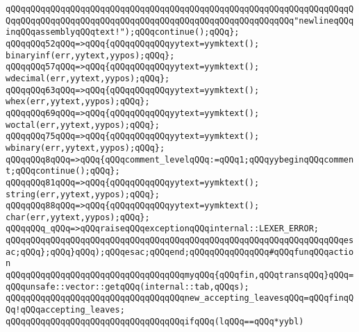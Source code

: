 \verb|qQQqqQQqqQQqqQQqqQQqqQQqqQQqqQQqqQQqqQQqqQQqqQQqqQQqqQQqqQQqqQQqqQQqqQQqqQQqqQQqqQQqqQQqqQQqqQQqqQQqqQQqqQQqqQQqqQQqqQQqqQQqqQQq"newlineqQQqinqQQqassemblyqQQqtext!");qQQqcontinue();qQQq};|\newline
\verb|qQQqqQQq52qQQq=>qQQq{qQQqqQQqqQQqyytext=yymktext();|\newline
\verb|binaryinf(err,yytext,yypos);qQQq};|\newline
\verb|qQQqqQQq57qQQq=>qQQq{qQQqqQQqqQQqyytext=yymktext();|\newline
\verb|wdecimal(err,yytext,yypos);qQQq};|\newline
\verb|qQQqqQQq63qQQq=>qQQq{qQQqqQQqqQQqyytext=yymktext();|\newline
\verb|whex(err,yytext,yypos);qQQq};|\newline
\verb|qQQqqQQq69qQQq=>qQQq{qQQqqQQqqQQqyytext=yymktext();|\newline
\verb|woctal(err,yytext,yypos);qQQq};|\newline
\verb|qQQqqQQq75qQQq=>qQQq{qQQqqQQqqQQqyytext=yymktext();|\newline
\verb|wbinary(err,yytext,yypos);qQQq};|\newline
\verb|qQQqqQQq8qQQq=>qQQq{qQQqcomment_levelqQQq:=qQQq1;qQQqyybeginqQQqcomment;qQQqcontinue();qQQq};|\newline
\verb|qQQqqQQq81qQQq=>qQQq{qQQqqQQqqQQqyytext=yymktext();|\newline
\verb|string(err,yytext,yypos);qQQq};|\newline
\verb|qQQqqQQq88qQQq=>qQQq{qQQqqQQqqQQqyytext=yymktext();|\newline
\verb|char(err,yytext,yypos);qQQq};|\newline
\verb|qQQqqQQq_qQQq=>qQQqraiseqQQqexceptionqQQqinternal::LEXER_ERROR;|\newline
\newline
\verb|qQQqqQQqqQQqqQQqqQQqqQQqqQQqqQQqqQQqqQQqqQQqqQQqqQQqqQQqqQQqqQQqqQQqesac;qQQq};qQQq}qQQq);qQQqesac;qQQqend;qQQqqQQqqQQqqQQq#qQQqfunqQQqaction|\newline
\newline
\verb|qQQqqQQqqQQqqQQqqQQqqQQqqQQqqQQqqQQqmyqQQq{qQQqfin,qQQqtransqQQq}qQQq=qQQqunsafe::vector::getqQQq(internal::tab,qQQqs);|\newline
\verb|qQQqqQQqqQQqqQQqqQQqqQQqqQQqqQQqqQQqnew_accepting_leavesqQQq=qQQqfinqQQq!qQQqaccepting_leaves;|\newline
\verb|qQQqqQQqqQQqqQQqqQQqqQQqqQQqqQQqqQQqifqQQq(lqQQq==qQQq*yybl)|\newline
